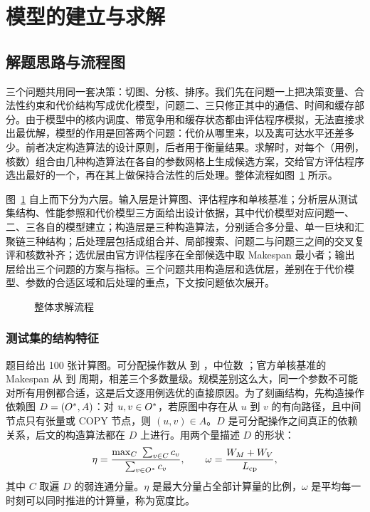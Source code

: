 \section{模型的建立与求解}

\subsection{解题思路与流程图}

三个问题共用同一套决策：切图、分核、排序。我们先在问题一上把决策变量、合法性约束和代价结构写成优化模型，问题二、三只修正其中的通信、时间和缓存部分。由于模型中的核内调度、带宽争用和缓存状态都由评估程序模拟，无法直接求出最优解，模型的作用是回答两个问题：代价从哪里来，以及离可达水平还差多少。前者决定构造算法的设计原则，后者用于衡量结果。求解时，对每个（用例，核数）组合由几种构造算法在各自的参数网格上生成候选方案，交给官方评估程序选出最好的一个，再在其上做保持合法性的后处理。整体流程如图~\ref{fig:framework} 所示。

图~\ref{fig:framework} 自上而下分为六层。输入层是计算图、评估程序和单核基准；分析层从测试集结构、性能参照和代价模型三方面给出设计依据，其中代价模型对应问题一、二、三各自的模型建立；构造层是三种构造算法，分别适合多分量、单一巨块和汇聚链三种结构；后处理层包括成组合并、局部搜索、问题二与问题三之间的交叉复评和核数补齐；选优层由官方评估程序在全部候选中取 Makespan 最小者；输出层给出三个问题的方案与指标。三个问题共用构造层和选优层，差别在于代价模型、参数的合适区域和后处理的重点，下文按问题依次展开。

\begin{figure}[H]
  \centering
  
  \caption{整体求解流程}
  \label{fig:framework}
\end{figure}

\subsubsection{测试集的结构特征}\label{sec:data-struct}

题目给出 100 张计算图。可分配操作数从  到 ，中位数 ；官方单核基准的 Makespan 从  到  周期，相差三个多数量级。规模差别这么大，同一个参数不可能对所有用例都合适，这是后文逐用例选优的直接原因。为了刻画结构，先构造操作依赖图 $D=(O^{\ast},A)$：对 $u,v\in O^{\ast}$，若原图中存在从 $u$ 到 $v$ 的有向路径，且中间节点只有张量或 COPY 节点，则 $(u,v)\in A$。$D$ 是可分配操作之间真正的依赖关系，后文的构造算法都在 $D$ 上进行。用两个量描述 $D$ 的形状：
\begin{equation}
  \eta = \frac{\max_{C}\ \sum_{v\in C} c_v}{\sum_{v\in O^{\ast}} c_v},\qquad
  \omega = \frac{W_M+W_V}{L_{\mathrm{cp}}},
  \label{eq:eta-omega}
\end{equation}
其中 $C$ 取遍 $D$ 的弱连通分量。$\eta$ 是最大分量占全部计算量的比例，$\omega$ 是平均每一时刻可以同时推进的计算量，称为宽度比。

